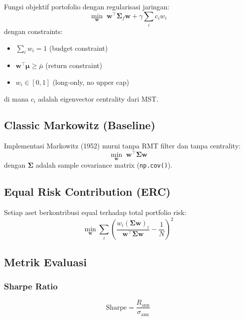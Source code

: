 \documentclass[12pt,a4paper]{article}
\begin{document}
Fungsi objektif portofolio dengan regularisasi jaringan:
\begin{equation}
  \min_{\mathbf{w}} \; \mathbf{w}^\top \mathbf{\Sigma}_f \mathbf{w}
  + \gamma \sum_i c_i w_i
\end{equation}
dengan constraints:
\begin{itemize}
  \item $\sum_i w_i = 1$ (budget constraint)
  \item $\mathbf{w}^\top \boldsymbol{\mu} \geq \bar{\mu}$ (return constraint)
  \item $w_i \in [0, 1]$ (long-only, no upper cap)
\end{itemize}

di mana $c_i$ adalah eigenvector centrality dari MST.

\subsection{Classic Markowitz (Baseline)}

Implementasi Markowitz (1952) murni tanpa RMT filter dan tanpa centrality:
\begin{equation}
  \min_{\mathbf{w}} \; \mathbf{w}^\top \mathbf{\Sigma} \mathbf{w}
\end{equation}
dengan $\mathbf{\Sigma}$ adalah sample covariance matrix (\texttt{np.cov()}).

\subsection{Equal Risk Contribution (ERC)}

Setiap aset berkontribusi equal terhadap total portfolio risk:
\begin{equation}
  \min_{\mathbf{w}} \sum_i \left( \frac{w_i (\mathbf{\Sigma}\mathbf{w})_i}{\mathbf{w}^\top \mathbf{\Sigma} \mathbf{w}} - \frac{1}{N} \right)^2
\end{equation}

\subsection{Metrik Evaluasi}

\subsubsection{Sharpe Ratio}
\begin{equation}
  \text{Sharpe} = \frac{R_{\text{ann}}}{\sigma_{\text{ann}}}
\end{equation}
\end{document}
